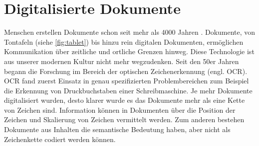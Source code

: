 \chapter{Digitalisierte Dokumente}
\label{chap:documents}


% 
Menschen erstellen Dokumente schon seit mehr als 4000 Jahren \parencite[13]{SmithDocumentCreationImage2014}. Dokumente, von Tontafeln (siehe \cref{fig:tablet})
bis hinzu rein digitalen Dokumenten, ermöglichen Kommunikation über zeitliche und ortliche Grenzen hinweg. 
Diese Technologie ist aus unserer modernen Kultur nicht mehr wegzudenken.  
Seit den 50er Jahren begann die Forschung im Bereich der optischen Zeichenerkennung 
(engl. OCR)\autocite{DavidS.DoermannHandbookdocumentimage2014}. OCR fand zuerst Einsatz in genau 
spezifizierten Problembereichen zum Beispiel die Erkennung von Druckbuchstaben einer Schreibmaschine. 
Je mehr Dokumente digitalisiert wurden, desto klarer wurde es das Dokumente mehr als 
eine Kette von Zeichen sind. 
Information können in Dokumenten über die Position der Zeichen und Skalierung von Zeichen vermittelt werden.
Zum anderen bestehen Dokumente aus Inhalten die semantische Bedeutung haben, aber nicht als Zeichenkette codiert werden können. 
